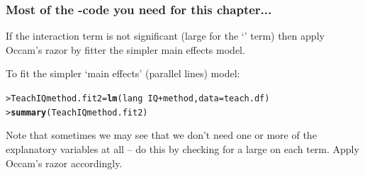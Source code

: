 \documentclass{beamer}\usepackage[]{graphicx}\usepackage[]{xcolor}
\makeatletter
\newcommand{\hlopt}[1]{\textcolor[rgb]{0,0,0}{#1}}%
\newcommand{\hlstd}[1]{\textcolor[rgb]{0.345,0.345,0.345}{#1}}%
\newcommand{\hlkwb}[1]{\textcolor[rgb]{0.69,0.353,0.396}{#1}}%
\newcommand{\hlkwc}[1]{\textcolor[rgb]{0.333,0.667,0.333}{#1}}%
\newcommand{\hlkwd}[1]{\textcolor[rgb]{0.737,0.353,0.396}{\textbf{#1}}}%
\newenvironment{kframe}{%
 \def\at@end@of@kframe{}%
 \ifinner\ifhmode%
  \def\at@end@of@kframe{\end{minipage}}%
  \begin{minipage}{\columnwidth}%
 \fi\fi%
 \def\FrameCommand##1{\hskip\@totalleftmargin \hskip-\fboxsep
 \colorbox{shadecolor}{##1}\hskip-\fboxsep
     \hskip-\linewidth \hskip-\@totalleftmargin \hskip\columnwidth}%
 \MakeFramed {\advance\hsize-\width
   \@totalleftmargin\z@ \linewidth\hsize
   \@setminipage}}%
 {\par\unskip\endMakeFramed%
 \at@end@of@kframe}
\newenvironment{knitrout}{}{} %
\makeatother
\begin{document}
\begin{frame}[fragile]
\frametitle{Most of the -code you need for this chapter...}

If the interaction term is not significant (large \pval{} for the `\rcode{:}' term) then apply Occam's razor by fitter the simpler main effects model.
\bigskip

To fit the simpler `main effects' (parallel lines) model:

\begin{knitrout}\scriptsize
{}\color{fgcolor}\begin{kframe}
\begin{alltt}
\hlstd{> }\hlstd{TeachIQmethod.fit2}\hlkwb{=}\hlkwd{lm}\hlstd{(lang}\hlopt{~}\hlstd{IQ}\hlopt{+}\hlstd{method,} \hlkwc{data}\hlstd{=teach.df)}
\hlstd{> }\hlkwd{summary}\hlstd{(TeachIQmethod.fit2)}
\end{alltt}
\end{kframe}
\end{knitrout}
\bigskip

Note that sometimes we may see that we don't need one or more of the explanatory variables at all  --  do this by checking for a large \pval{} on each term. Apply Occam's razor accordingly.
\vfill

\end{frame}
\end{document}
